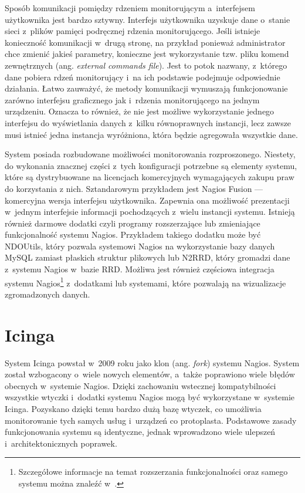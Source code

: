 Sposób komunikacji pomiędzy rdzeniem monitorującym a~interfejsem
użytkownika jest bardzo sztywny. Interfejs użytkownika uzyskuje dane
o~stanie sieci z~plików pamięci podręcznej rdzenia
monitorującego. Jeśli istnieje konieczność komunikacji w~drugą stronę,
na przykład ponieważ administrator chce zmienić jakieś parametry,
konieczne jest wykorzystanie tzw. pliku komend zewnętrznych (ang. {\em
  external commands file}). Jest to potok nazwany, z~którego dane
pobiera rdzeń monitorujący i~na ich podstawie podejmuje odpowiednie
działania. Łatwo zauważyć, że metody komunikacji wymuszają
funkcjonowanie zarówno interfejsu graficznego jak i~rdzenia
monitorującego na jednym urządzeniu. Oznacza to również, że nie jest
możliwe wykorzystanie jednego interfejsu do wyświetlania danych
z~kilku równoprawnych instancji, lecz zawsze musi istnieć jedna
instancja wyróżniona, która będzie agregowała wszystkie dane.

System posiada rozbudowane możliwości monitorowania
rozproszonego. Niestety, do wykonania znacznej części z~tych
konfiguracji potrzebne są elementy systemu, które są dystrybuowane na
licencjach komercyjnych wymagających zakupu praw do korzystania z
nich. Sztandarowym przykładem jest Nagios Fusion --- komercyjna
wersja interfejsu użytkownika. Zapewnia ona możliwość prezentacji
w~jednym interfejsie informacji pochodzących z~wielu instancji
systemu. Istnieją również darmowe dodatki czyli programy rozszerzające
lub zmieniające funkcjonalność systemu Nagios. Przykładem takiego
dodatku może być NDOUtils, który pozwala systemowi Nagios na
wykorzystanie bazy danych MySQL zamiast płaskich struktur plikowych
lub N2RRD, który gromadzi dane z~systemu Nagios w~bazie RRD. Możliwa
jest również częściowa integracja systemu Nagios\footnote{Szczegółowe
  informacje na temat rozszerzania funkcjonalności oraz samego systemu
  można znaleźć w~\cite{www:Nagios}.}  z~dodatkami lub systemami,
które pozwalają na wizualizacje zgromadzonych danych.

\section[Icinga][Icinga]{Icinga}
\label{subsec:Icinga}

System Icinga powstał w~2009 roku jako klon (ang. {\em fork}) systemu
Nagios. System został wzbogacony o~wiele nowych elementów, a~także
poprawiono wiele błędów obecnych w~systemie Nagios. Dzięki zachowaniu
wstecznej kompatybilności wszystkie wtyczki i~dodatki systemu Nagios
mogą być wykorzystane w~systemie Icinga. Pozyskano dzięki temu bardzo
dużą bazę wtyczek, co umożliwia monitorowanie tych samych usług
i~urządzeń co protoplasta. Podstawowe zasady funkcjonowania systemu są
identyczne, jednak wprowadzono wiele ulepszeń i~architektonicznych
poprawek.

